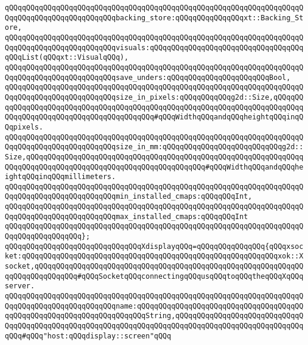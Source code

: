 \verb|qQQqqQQqqQQqqQQqqQQqqQQqqQQqqQQqqQQqqQQqqQQqqQQqqQQqqQQqqQQqqQQqqQQqqQQqqQQqqQQqqQQqqQQqqQQqqQQqbacking_store:qQQqqQQqqQQqqQQqxt::Backing_Store,|\newline
\newline
\verb|qQQqqQQqqQQqqQQqqQQqqQQqqQQqqQQqqQQqqQQqqQQqqQQqqQQqqQQqqQQqqQQqqQQqqQQqqQQqqQQqqQQqqQQqqQQqqQQqvisuals:qQQqqQQqqQQqqQQqqQQqqQQqqQQqqQQqqQQqqQQqList(qQQqxt::VisualqQQq),|\newline
\verb|qQQqqQQqqQQqqQQqqQQqqQQqqQQqqQQqqQQqqQQqqQQqqQQqqQQqqQQqqQQqqQQqqQQqqQQqqQQqqQQqqQQqqQQqqQQqqQQqsave_unders:qQQqqQQqqQQqqQQqqQQqqQQqBool,|\newline
\newline
\verb|qQQqqQQqqQQqqQQqqQQqqQQqqQQqqQQqqQQqqQQqqQQqqQQqqQQqqQQqqQQqqQQqqQQqqQQqqQQqqQQqqQQqqQQqqQQqqQQqsize_in_pixels:qQQqqQQqqQQqg2d::Size,qQQqqQQqqQQqqQQqqQQqqQQqqQQqqQQqqQQqqQQqqQQqqQQqqQQqqQQqqQQqqQQqqQQqqQQqqQQqqQQqqQQqqQQqqQQqqQQqqQQqqQQqqQQqqQQq#qQQqWidthqQQqandqQQqheightqQQqinqQQqpixels.|\newline
\verb|qQQqqQQqqQQqqQQqqQQqqQQqqQQqqQQqqQQqqQQqqQQqqQQqqQQqqQQqqQQqqQQqqQQqqQQqqQQqqQQqqQQqqQQqqQQqqQQqsize_in_mm:qQQqqQQqqQQqqQQqqQQqqQQqqQQqg2d::Size,qQQqqQQqqQQqqQQqqQQqqQQqqQQqqQQqqQQqqQQqqQQqqQQqqQQqqQQqqQQqqQQqqQQqqQQqqQQqqQQqqQQqqQQqqQQqqQQqqQQqqQQqqQQqqQQq#qQQqWidthqQQqandqQQqheightqQQqinqQQqmillimeters.|\newline
\newline
\verb|qQQqqQQqqQQqqQQqqQQqqQQqqQQqqQQqqQQqqQQqqQQqqQQqqQQqqQQqqQQqqQQqqQQqqQQqqQQqqQQqqQQqqQQqqQQqqQQqmin_installed_cmaps:qQQqqQQqInt,|\newline
\verb|qQQqqQQqqQQqqQQqqQQqqQQqqQQqqQQqqQQqqQQqqQQqqQQqqQQqqQQqqQQqqQQqqQQqqQQqqQQqqQQqqQQqqQQqqQQqqQQqmax_installed_cmaps:qQQqqQQqInt|\newline
\verb|qQQqqQQqqQQqqQQqqQQqqQQqqQQqqQQqqQQqqQQqqQQqqQQqqQQqqQQqqQQqqQQqqQQqqQQqqQQqqQQqqQQqqQQq};|\newline
\newline
\verb|qQQqqQQqqQQqqQQqqQQqqQQqqQQqqQQqXdisplayqQQq=qQQqqQQqqQQqqQQq{qQQqxsocket:qQQqqQQqqQQqqQQqqQQqqQQqqQQqqQQqqQQqqQQqqQQqqQQqqQQqqQQqqQQqxok::Xsocket,qQQqqQQqqQQqqQQqqQQqqQQqqQQqqQQqqQQqqQQqqQQqqQQqqQQqqQQqqQQqqQQqqQQqqQQqqQQqqQQq#qQQqSocketqQQqconnectingqQQqusqQQqtoqQQqtheqQQqXqQQqserver.|\newline
\verb|qQQqqQQqqQQqqQQqqQQqqQQqqQQqqQQqqQQqqQQqqQQqqQQqqQQqqQQqqQQqqQQqqQQqqQQqqQQqqQQqqQQqqQQqqQQqqQQqname:qQQqqQQqqQQqqQQqqQQqqQQqqQQqqQQqqQQqqQQqqQQqqQQqqQQqqQQqqQQqqQQqqQQqqQQqString,qQQqqQQqqQQqqQQqqQQqqQQqqQQqqQQqqQQqqQQqqQQqqQQqqQQqqQQqqQQqqQQqqQQqqQQqqQQqqQQqqQQqqQQqqQQqqQQqqQQqqQQq#qQQq"host:qQQqdisplay::screen"qQQq|\newline

